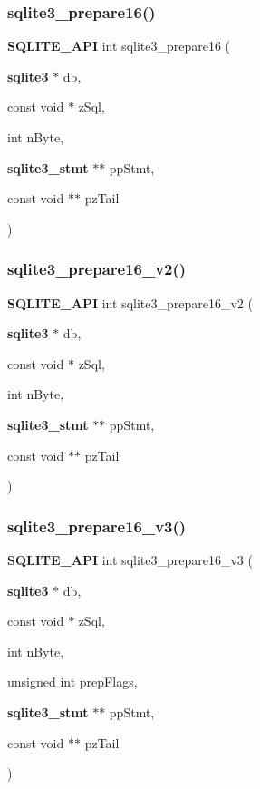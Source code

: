 \mbox{\label{sqlite3_8h_ad1651e0e1c121ec4027dbd419eb8daca}} 
\subsubsection{sqlite3\_prepare16()}
{\footnotesize\ttfamily \textbf{ S\+Q\+L\+I\+T\+E\+\_\+\+A\+PI} int sqlite3\+\_\+prepare16 (\begin{DoxyParamCaption}\item[{\textbf{ sqlite3} $\ast$}]{db,  }\item[{const void $\ast$}]{z\+Sql,  }\item[{int}]{n\+Byte,  }\item[{\textbf{ sqlite3\+\_\+stmt} $\ast$$\ast$}]{pp\+Stmt,  }\item[{const void $\ast$$\ast$}]{pz\+Tail }\end{DoxyParamCaption})}

\mbox{\label{sqlite3_8h_ad1768867c1e3f150ebafb122c244a228}} 
\subsubsection{sqlite3\_prepare16\_v2()}
{\footnotesize\ttfamily \textbf{ S\+Q\+L\+I\+T\+E\+\_\+\+A\+PI} int sqlite3\+\_\+prepare16\+\_\+v2 (\begin{DoxyParamCaption}\item[{\textbf{ sqlite3} $\ast$}]{db,  }\item[{const void $\ast$}]{z\+Sql,  }\item[{int}]{n\+Byte,  }\item[{\textbf{ sqlite3\+\_\+stmt} $\ast$$\ast$}]{pp\+Stmt,  }\item[{const void $\ast$$\ast$}]{pz\+Tail }\end{DoxyParamCaption})}

\mbox{\label{sqlite3_8h_a5cd3e5de881f229ab94e7d140e9b0435}} 
\subsubsection{sqlite3\_prepare16\_v3()}
{\footnotesize\ttfamily \textbf{ S\+Q\+L\+I\+T\+E\+\_\+\+A\+PI} int sqlite3\+\_\+prepare16\+\_\+v3 (\begin{DoxyParamCaption}\item[{\textbf{ sqlite3} $\ast$}]{db,  }\item[{const void $\ast$}]{z\+Sql,  }\item[{int}]{n\+Byte,  }\item[{unsigned int}]{prep\+Flags,  }\item[{\textbf{ sqlite3\+\_\+stmt} $\ast$$\ast$}]{pp\+Stmt,  }\item[{const void $\ast$$\ast$}]{pz\+Tail }\end{DoxyParamCaption})}

